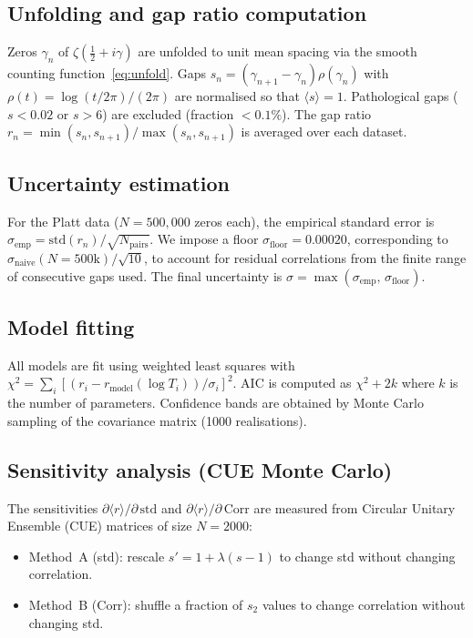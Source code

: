 
\subsection*{Unfolding and gap ratio computation}

Zeros $\gamma_n$ of $\zeta(\tfrac{1}{2} + i\gamma)$ are unfolded to unit mean
spacing via the smooth counting function~\eqref{eq:unfold}.
Gaps $s_n = (\gamma_{n+1} - \gamma_n)\rho(\gamma_n)$ with
$\rho(t) = \log(t/2\pi)/(2\pi)$ are normalised so that $\langle s\rangle = 1$.
Pathological gaps ($s < 0.02$ or $s > 6$) are excluded (fraction $< 0.1\%$).
The gap ratio $r_n = \min(s_n, s_{n+1})/\max(s_n, s_{n+1})$ is averaged over
each dataset.

\subsection*{Uncertainty estimation}

For the Platt data ($N = 500{,}000$ zeros each), the empirical standard error
is $\sigma_{\mathrm{emp}} = \mathrm{std}(r_n)/\sqrt{N_{\mathrm{pairs}}}$.
We impose a floor $\sigma_{\mathrm{floor}} = 0.00020$, corresponding to
$\sigma_{\mathrm{naive}}(N{=}500\mathrm{k})/\sqrt{10}$, to account for
residual correlations from the finite range of consecutive gaps used.
The final uncertainty is $\sigma = \max(\sigma_{\mathrm{emp}},\, \sigma_{\mathrm{floor}})$.

\subsection*{Model fitting}

All models are fit using weighted least squares with
$\chi^2 = \sum_i [(r_i - r_{\mathrm{model}}(\log T_i))/\sigma_i]^2$.
AIC is computed as $\chi^2 + 2k$ where $k$ is the number of parameters.
Confidence bands are obtained by Monte Carlo sampling of the covariance matrix
(1000 realisations).

\subsection*{Sensitivity analysis (CUE Monte Carlo)}

The sensitivities $\partial\langle r\rangle/\partial\,\mathrm{std}$ and
$\partial\langle r\rangle/\partial\,\mathrm{Corr}$ are measured from
Circular Unitary Ensemble (CUE) matrices of size $N = 2000$:
\begin{itemize}
\item Method~A (std): rescale $s' = 1 + \lambda(s-1)$ to change std without
changing correlation.
\item Method~B (Corr): shuffle a fraction of $s_2$ values to change correlation
without changing std.
\end{itemize}

